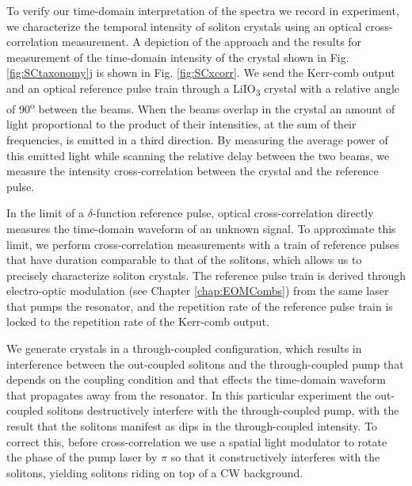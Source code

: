 To verify our time-domain interpretation of the spectra we record in experiment, we characterize the temporal intensity of soliton crystals using an optical cross-correlation measurement. A depiction of the approach and the results for measurement of the time-domain intensity of the crystal shown in Fig. \ref{fig:SCtaxonomy}j is shown in Fig. \ref{fig:SCxcorr}. We send the Kerr-comb output and an optical reference pulse train through a LiIO\textsubscript{3} crystal with a relative angle of 90\textsuperscript{o} between the beams. When the beams overlap in the crystal an amount of light proportional to the product of their intensities, at the sum of their frequencies, is emitted in a third direction. By measuring the average power of this emitted light while scanning the relative delay between the two beams, we measure the intensity cross-correlation between the crystal and the reference pulse.

In the limit of a $\delta$-function reference pulse, optical cross-correlation directly measures the time-domain waveform of an unknown signal. To approximate this limit, we perform cross-correlation measurements with a train of reference pulses that have duration comparable to that of the solitons, which allows us to precisely characterize soliton crystals. The reference pulse train is derived through electro-optic modulation (see Chapter \ref{chap:EOMCombs}) from the same laser that pumps the resonator, and the repetition rate of the reference pulse train is locked to the repetition rate of the Kerr-comb output. 

We generate crystals in a through-coupled configuration, which results in interference between the out-coupled solitons and the through-coupled pump that depends on the coupling condition and that effects the time-domain waveform that propagates away from the resonator. In this particular experiment the out-coupled solitons destructively interfere with the through-coupled pump, with the result that the solitons manifest as dips in the through-coupled intensity. To correct this, before cross-correlation we use a spatial light modulator to rotate the phase of the pump laser by $\pi$ so that it constructively interferes with the solitons, yielding solitons riding on top of a CW background. 



